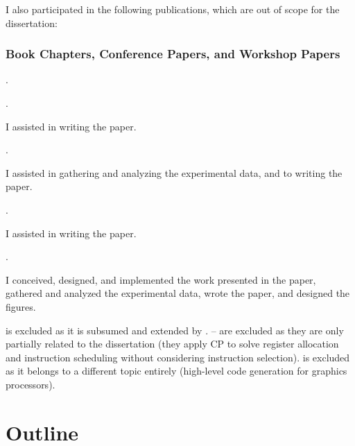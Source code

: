 I also participated in the following publications, which are out of scope for
the dissertation:

\subsubsection{Book Chapters, Conference Papers, and Workshop Papers}

\begin{publications}[resume]
  \item {}
    .
  \item {}
    .
    \begin{authorsContribution}
      I assisted in writing the paper.
    \end{authorsContribution}
  \item {}
    .
    \begin{authorsContribution}
      I assisted in gathering and analyzing the experimental data, and to
      writing the paper.
    \end{authorsContribution}
  \item {}
    .
    \begin{authorsContribution}
      I assisted in writing the paper.
    \end{authorsContribution}
  \item {}
    .
    \begin{authorsContribution}
      I conceived, designed, and implemented the work presented in the paper,
      gathered and analyzed the experimental data, wrote the paper, and designed
      the figures.
    \end{authorsContribution}
\end{publications}
%
 is excluded as it is subsumed and extended by
. -- are
excluded as they are only partially related to the dissertation (they apply
\gls{CP} to solve \gls{register allocation} and \gls{instruction scheduling}
without considering \gls{instruction selection}).  is
excluded as it belongs to a different topic entirely (high-level code generation
for graphics processors).

\section{Outline}


